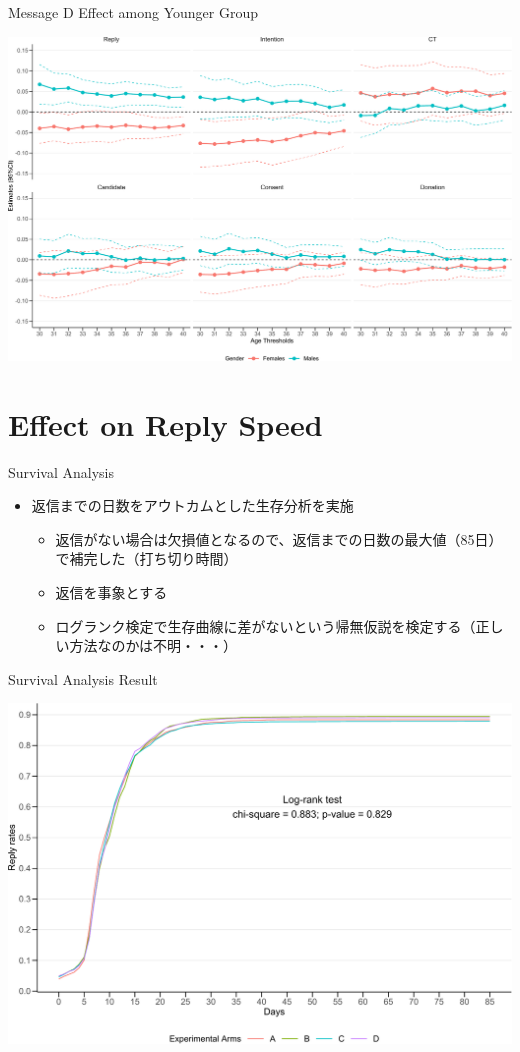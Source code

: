 \documentclass[
      aspectratio=169,
        12pt,
    ]{beamer}
\providecommand{\tightlist}{%
  \setlength{\itemsep}{0pt}\setlength{\parskip}{0pt}}
\begin{document}
\begin{frame}{Message D Effect among Younger Group}
\protect\hypertarget{message-d-effect-among-younger-group}{}
\begin{center}\includegraphics[width=0.75\linewidth]{report_files/figure-beamer/plotD-change-age-threshold-1} \end{center}
\end{frame}

\hypertarget{effect-on-reply-speed}{%
\section{Effect on Reply Speed}\label{effect-on-reply-speed}}

\begin{frame}{Survival Analysis}
\protect\hypertarget{survival-analysis}{}
\begin{itemize}
\tightlist
\item
  返信までの日数をアウトカムとした生存分析を実施

  \begin{itemize}
  \tightlist
  \item
    返信がない場合は欠損値となるので、返信までの日数の最大値（85日）で補完した（打ち切り時間）
  \item
    返信を事象とする
  \item
    ログランク検定で生存曲線に差がないという帰無仮説を検定する（正しい方法なのかは不明・・・）
  \end{itemize}
\end{itemize}
\end{frame}

\begin{frame}{Survival Analysis Result}
\protect\hypertarget{survival-analysis-result}{}
\begin{center}\includegraphics[width=0.75\linewidth]{report_files/figure-beamer/plot-surv-1} \end{center}
\end{frame}
\end{document}
